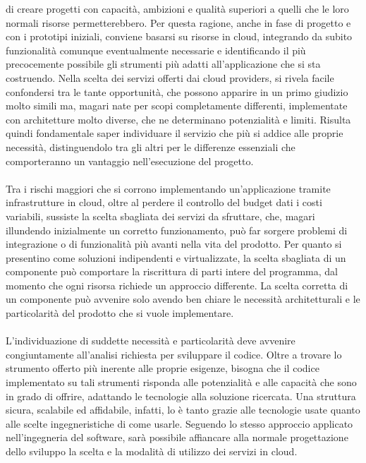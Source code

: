 di creare progetti con capacità, ambizioni e qualità superiori a quelli che le loro normali risorse permetterebbero.
Per questa ragione, anche in fase di progetto e con i prototipi iniziali, conviene basarsi su risorse in cloud, 
integrando da subito funzionalità comunque eventualmente necessarie e 
identificando il più precocemente possibile gli strumenti più adatti all'applicazione che si sta costruendo.
Nella scelta dei servizi offerti dai cloud providers, si rivela facile confondersi tra le tante opportunità, 
che possono apparire in un primo giudizio molto simili ma, magari nate per scopi completamente differenti, 
implementate con architetture molto diverse, che ne determinano potenzialità e limiti.
Risulta quindi fondamentale saper individuare il servizio che più si addice alle proprie necessità, 
distinguendolo tra gli altri per le differenze essenziali che comporteranno un vantaggio nell'esecuzione del progetto.\\
\\
Tra i rischi maggiori che si corrono implementando un'applicazione tramite infrastrutture in cloud,
oltre al perdere il controllo del budget dati i costi variabili, sussiste la scelta sbagliata dei servizi da sfruttare, che, 
magari illundendo inizialmente un corretto funzionamento, può far sorgere problemi di integrazione o di funzionalità 
più avanti nella vita del prodotto.
Per quanto si presentino come soluzioni indipendenti e virtualizzate, 
la scelta sbagliata di un componente può comportare la riscrittura di parti intere del programma,
dal momento che ogni risorsa richiede un approccio differente.
La scelta corretta di un componente può avvenire solo avendo ben chiare le necessità architetturali e le particolarità del prodotto che si vuole implementare.\\
\\
L'individuazione di suddette necessità e particolarità deve avvenire congiuntamente all'analisi richiesta per sviluppare il codice.
Oltre a trovare lo strumento offerto più inerente alle proprie esigenze, 
bisogna che il codice implementato su tali strumenti risponda alle potenzialità e alle capacità che sono in grado di offrire, 
adattando le tecnologie alla soluzione ricercata.
Una struttura sicura, scalabile ed affidabile, infatti, lo è tanto grazie alle tecnologie usate quanto alle scelte ingegneristiche di come usarle.
Seguendo lo stesso approccio applicato nell'ingegneria del software, sarà possibile affiancare alla normale progettazione dello sviluppo 
la scelta e la modalità di utilizzo dei servizi in cloud.\\

